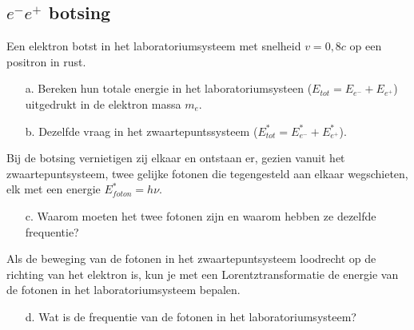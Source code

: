 \subsection{$e^{-}e^{+}$ botsing}
Een elektron botst in het laboratoriumsysteem met snelheid $v = 0,8c$ op een
positron in rust.
\begin{itemize}
\item [a.]
Bereken hun totale energie in het laboratoriumsysteen 
($E_{tot} = E_{e^{-}} + E_{e^{+}}$) uitgedrukt in 
de elektron massa $m_{e}$.
\item [b.]
Dezelfde vraag in het zwaartepuntssysteem ($E^{*}_{tot} = E^{*}_{e^{-}} + E^{*}_{e^{+}}$).
\end{itemize}
Bij de botsing vernietigen zij elkaar en ontstaan er, gezien vanuit het 
zwaartepuntsysteem, twee gelijke fotonen die tegengesteld aan elkaar 
wegschieten, elk met een energie $E^{*}_{foton} = h \nu$.
\begin{itemize}
\item [c.]
Waarom moeten het twee fotonen zijn en waarom hebben ze dezelfde frequentie?
\end{itemize}
Als de beweging van de fotonen in het zwaartepuntsysteem loodrecht 
op de richting van het elektron is, kun je met een Lorentztransformatie
de energie van de fotonen in het laboratoriumsysteem bepalen.
\begin{itemize}
\item [d.]
Wat is de frequentie van de fotonen in het laboratoriumsysteem?
\end{itemize}
